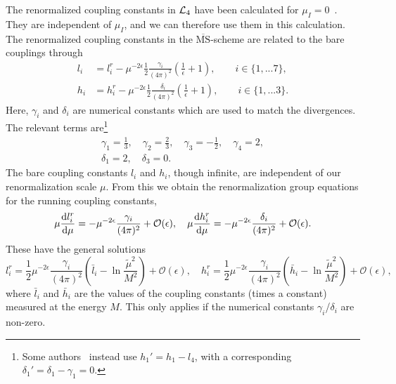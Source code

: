 The renormalized coupling constants in $\mathcal{L}_4$ have been calculated for $\mu_I = 0$~\cite{Gasser-Leutwyler:chiral}.
They are independent of $\mu_I$, and we can therefore use them in this calculation.
The renormalized coupling constants in the $\overline{\mathrm{MS}}$-scheme are related to the bare couplings through
\begin{align}
    l_i 
    & = 
    l_i^r 
    - \mu^{-2\epsilon}\frac{1}{2} \frac{\gamma_i }{(4 \pi)^2} 
    \left(\frac{1}{\epsilon} + 1 \right),
    \quad \quad
    i \in \{1, ... 7\},
    \\
    h_i 
    & = 
    h_i^r
    - \mu^{-2\epsilon} \frac{1}{2}  \frac{\delta_i }{(4 \pi)^2} 
    \left(\frac{1}{\epsilon} + 1 \right), 
    \quad \quad
    i \in \{1, ... 3\}.
\end{align}
%
Here, $\gamma_i$ and $\delta_i$ are numerical constants which are used to match the divergences.
The relevant terms are\footnote{Some authors~\cite{Andersen:two-flavor-chpt,GERBER1989387} instead use $h_1' = h_1 - l_4$, with a corresponding $\delta_1' = \delta_1 - \gamma_1 = 0$.}
\begin{gather}
    \gamma_1 = \frac{1}{3}, \quad
    \gamma_2 = \frac{2}{3}, \quad
    \gamma_3 = - \frac{1}{2}, \quad
    \gamma_4 = 2, \\
    \delta_1 = 2, \quad
    \delta_3 = 0.
\end{gather}
The bare coupling constants $l_i$ and $h_i$, though infinite, are independent of our renormalization scale $\mu$.
From this we obtain the renormalization group equations for the running coupling constants,
\begin{equation}
    \mu \diff{l_i^r}{\mu } = - \mu^{-2\epsilon} \frac{\gamma_i }{(4 \pi)^2} + \mathcal{O}(\epsilon), \quad
    \mu \diff{h_i^r}{\mu } = -  \mu^{-2\epsilon}\frac{\delta_i}{(4 \pi)^2}+ \mathcal{O}(\epsilon).
\end{equation}
%
These have the general solutions
\begin{equation}
    l_i^r 
    = \frac{1}{2} \mu^{-2\epsilon} \frac{\gamma_i}{(4 \pi)^2} 
    \left( \bar l_i - \ln{\frac{\tilde \mu^2}{M^2}} \right)+ \mathcal{O}(\epsilon),
    \quad
    h_i^r 
    = \frac{1}{2} \mu^{-2\epsilon} \frac{\gamma_i}{(4 \pi)^2} 
    \left( \bar h_i - \ln{\frac{\tilde \mu^2}{M^2}} \right)+ \mathcal{O}(\epsilon),
\end{equation}
%
where $\bar l_i$ and $\bar h_i$ are the values of the coupling constants (times a constant) measured at the energy $M$.
This only applies if the numerical constants $\gamma_i$/$\delta_i$ are non-zero.
